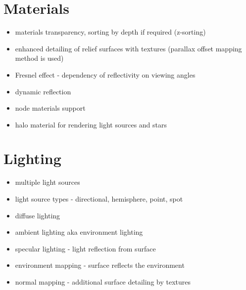 \documentclass[a4paper,12pt,oneside]{sphinxmanual}
\begin{document}
\section{Materials}
\label{features:id3}\begin{itemize}
\item {} 
materials transparency, sorting by depth if required (z-sorting)

\item {} 
enhanced detailing of relief surfaces with textures (parallax offset mapping method is used)

\item {} 
Fresnel effect - dependency of reflectivity on viewing angles

\item {} 
dynamic reflection

\item {} 
node materials support

\item {} 
halo material for rendering light sources and stars

\end{itemize}


\section{Lighting}
\label{features:id4}\begin{itemize}
\item {} 
multiple light sources

\item {} 
light source types - directional, hemisphere, point, spot

\item {} 
diffuse lighting

\item {} 
ambient lighting aka environment lighting

\item {} 
specular lighting - light reflection from surface

\item {} 
environment mapping - surface reflects the environment

\item {} 
normal mapping - additional surface detailing by textures

\end{itemize}
\end{document}
